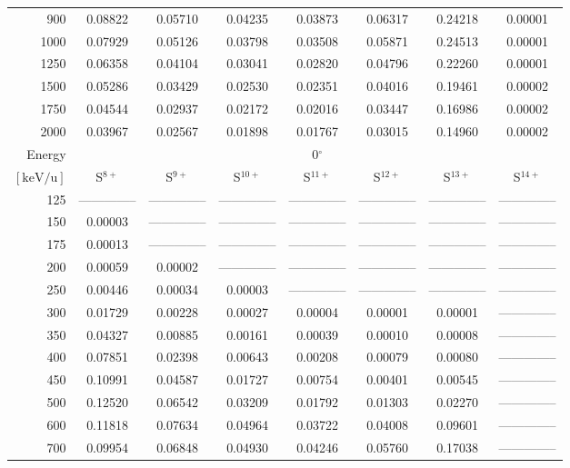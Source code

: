 \begin{table}[ht]
\begin{tabular}{r|c|c|c|c|c|c|c}
      900 & 0.08822 & 0.05710 & 0.04235 & 0.03873 & 0.06317 & 0.24218 & 0.00001 \\
     1000 & 0.07929 & 0.05126 & 0.03798 & 0.03508 & 0.05871 & 0.24513 & 0.00001 \\
     1250 & 0.06358 & 0.04104 & 0.03041 & 0.02820 & 0.04796 & 0.22260 & 0.00001 \\
     1500 & 0.05286 & 0.03429 & 0.02530 & 0.02351 & 0.04016 & 0.19461 & 0.00002 \\
     1750 & 0.04544 & 0.02937 & 0.02172 & 0.02016 & 0.03447 & 0.16986 & 0.00002 \\
     2000 & 0.03967 & 0.02567 & 0.01898 & 0.01767 & 0.03015 & 0.14960 & 0.00002 \\ \cline{1-8}
    Energy & \multicolumn{7}{c}{0$^\circ$} \\ \cline{2-8}
    $\mathrm{[keV/u]}$ & S$^{8+}$ & S$^{9+}$ & S$^{10+}$ & S$^{11+}$ & S$^{12+}$ & S$^{13+}$ & S$^{14+}$ \\ \cline{1-8}
      125 & -------------- & -------------- & -------------- & -------------- & -------------- & -------------- & -------------- \\
      150 & 0.00003 & -------------- & -------------- & -------------- & -------------- & -------------- & -------------- \\
      175 & 0.00013 & -------------- & -------------- & -------------- & -------------- & -------------- & -------------- \\
      200 & 0.00059 & 0.00002 & -------------- & -------------- & -------------- & -------------- & -------------- \\
      250 & 0.00446 & 0.00034 & 0.00003 & -------------- & -------------- & -------------- & -------------- \\
      300 & 0.01729 & 0.00228 & 0.00027 & 0.00004 & 0.00001 & 0.00001 & -------------- \\
      350 & 0.04327 & 0.00885 & 0.00161 & 0.00039 & 0.00010 & 0.00008 & -------------- \\
      400 & 0.07851 & 0.02398 & 0.00643 & 0.00208 & 0.00079 & 0.00080 & -------------- \\
      450 & 0.10991 & 0.04587 & 0.01727 & 0.00754 & 0.00401 & 0.00545 & -------------- \\
      500 & 0.12520 & 0.06542 & 0.03209 & 0.01792 & 0.01303 & 0.02270 & -------------- \\
      600 & 0.11818 & 0.07634 & 0.04964 & 0.03722 & 0.04008 & 0.09601 & -------------- \\
      700 & 0.09954 & 0.06848 & 0.04930 & 0.04246 & 0.05760 & 0.17038 & -------------- \\

\end{tabular}
\end{table}
